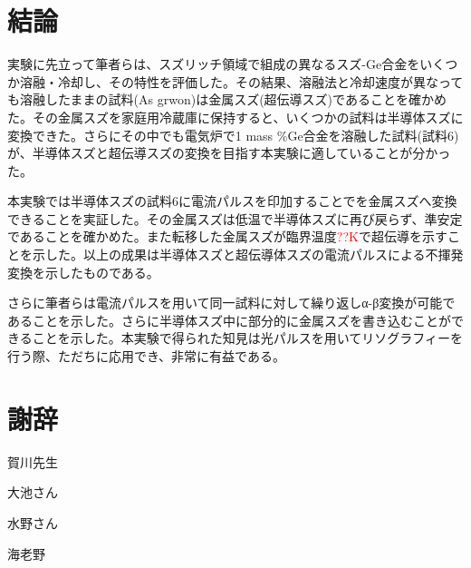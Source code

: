 \section{結論}
実験に先立って筆者らは、スズリッチ領域で組成の異なるスズ-Ge合金をいくつか溶融・冷却し、その特性を評価した。その結果、溶融法と冷却速度が異なっても溶融したままの試料(As grwon)は金属スズ(超伝導スズ)であることを確かめた。その金属スズを家庭用冷蔵庫に保持すると、いくつかの試料は半導体スズに変換できた。さらにその中でも電気炉で1 mass \%Ge合金を溶融した試料(試料6)が、半導体スズと超伝導スズの変換を目指す本実験に適していることが分かった。

本実験では半導体スズの試料6に電流パルスを印加することでを金属スズへ変換できることを実証した。その金属スズは低温で半導体スズに再び戻らず、準安定であることを確かめた。また転移した金属スズが臨界温度\textcolor{red}{??K}で超伝導を示すことを示した。以上の成果は半導体スズと超伝導体スズの電流パルスによる不揮発変換を示したものである。

さらに筆者らは電流パルスを用いて同一試料に対して繰り返しα-β変換が可能であることを示した。さらに半導体スズ中に部分的に金属スズを書き込むことができることを示した。本実験で得られた知見は光パルスを用いてリソグラフィーを行う際、ただちに応用でき、非常に有益である。

\section*{謝辞}
賀川先生

大池さん

水野さん

海老野

\newpage